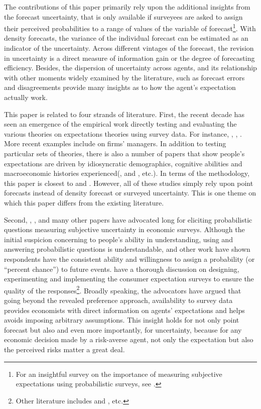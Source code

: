 \documentclass[12pt]{article}
\begin{document}
	The contributions of this paper primarily rely upon the additional insights from the forecast uncertainty, that is only available if surveyees are asked to assign their perceived probabilities to a range of values of the variable of forecast\footnote{For an insightful survey on the importance of measuring subjective expectations using probabilistic surveys, see \citet{manski2004measuring}.}. With density forecasts,  the variance of the individual forecast can be estimated as an indicator of the uncertainty. Across different vintages of the forecast, the revision in uncertainty is a direct measure of information gain or the degree of forecasting efficiency. Besides, the dispersion of uncertainty across agents, and its relationship with other moments widely examined by the literature, such as forecast errors and disagreements provide many insights as to how the agent's expectation actually work.  
	
	This paper is related to four strands of literature. First, the recent decade has seen an emergence of the empirical work directly testing and evaluating the various theories on expectations theories using survey data. For instance, \citet{mankiw2003disagreement}, \citet{carroll2003macroeconomic}, \citet{branch2004theory}. More recent examples include \citet{coibion2018firms} on firms' managers. In addition to testing particular sets of theories, there is also a number of papers that show people's expectations are driven by idiosyncratic demographics, cognitive abilities and macroeconomic histories experienced(\citet{malmendier2015learning}, \citet{das2017socioeconomic} and \citet{d2019iq}, etc.). In terms of the methodology, this paper is closest to \citet{coibion2012can} and \citet{fuhrer2018intrinsic}.  However, all of these studies simply rely upon point forecasts instead of density forecast or surveyed uncertainty. This is one theme on which this paper differs from the existing literature.   
	
	
	Second, \citet{manski2004measuring}, \citet{delavande2011measuring}, \citet{manski2018survey} and many other papers have advocated long for eliciting probabilistic questions measuring subjective uncertainty in economic surveys. Although the initial suspicion concerning to people's ability in understanding, using and answering probabilistic questions is understandable, \citet{bertrand2001people} and other work have shown respondents have the consistent ability and willingness to assign a probability (or “percent chance”) to future events. \citet{armantier2017overview} have a thorough discussion on designing, experimenting and implementing the consumer expectation surveys to ensure the quality of the responses\footnote{Other literature includes \citet{van2008rethinking} and \citet{delavande2014probabilistic}, etc.}. Broadly speaking, the advocators have argued that going beyond the revealed preference approach, availability to survey data provides economists with direct information on agents' expectations and helps avoids imposing arbitrary assumptions.  This insight holds for not only point forecast but also and even more importantly, for uncertainty, because for any economic decision made by a risk-averse agent, not only the expectation but also the perceived risks matter a great deal. 
	 
\end{document}
